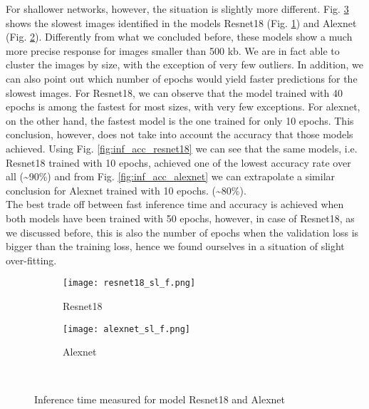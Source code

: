 For shallower networks, however, the situation is slightly more different. Fig. \ref{fig:sl_f_shallow} shows the slowest images identified in the models Resnet18 (Fig. \ref{fig:resnet18_sl_f}) and Alexnet (Fig. \ref{fig:alexnet_sl_f}). Differently from what we concluded before, these models show a much more precise response for images smaller than 500 kb. We are in fact able to cluster the images by size, with the exception of very few outliers. In addition, we can also point out which number of epochs would yield faster predictions for the slowest images. For Resnet18, we can observe that the model trained with 40 epochs is among the fastest for most sizes, with very few exceptions. For alexnet, on the other hand, the fastest model is the one trained for only 10 epochs. This conclusion, however, does not take into account the accuracy that those models achieved. Using Fig. \ref{fig:inf_acc_resnet18} we can see that the same models, i.e. Resnet18 trained with 10 epochs, achieved one of the lowest accuracy rate over all (\textasciitilde90\%) and from Fig. \ref{fig:inf_acc_alexnet} we can extrapolate a similar conclusion for Alexnet trained with 10 epochs. (\textasciitilde80\%). \\
The best trade off between fast inference time and accuracy is achieved when both models have been trained with 50 epochs, however, in case of Resnet18, as we discussed before, this is also the number of epochs when the validation loss is bigger than the training loss, hence we found ourselves in a situation of slight over-fitting. \\
\begin{figure}[h]
     \begin{subfigure}{0.5\textwidth}
	    \texttt{[image: resnet18\_sl\_f.png]}
	    \caption{Resnet18}
         \label{fig:resnet18_sl_f}
         
     \end{subfigure}
     \hfill
     \begin{subfigure}{0.5\textwidth}
	    \texttt{[image: alexnet\_sl\_f.png]}
	    \caption{Alexnet}
        \label{fig:alexnet_sl_f}
        
     \end{subfigure}\\
     \caption{Inference time measured for model Resnet18 and Alexnet}
        \label{fig:sl_f_shallow}
\end{figure}


